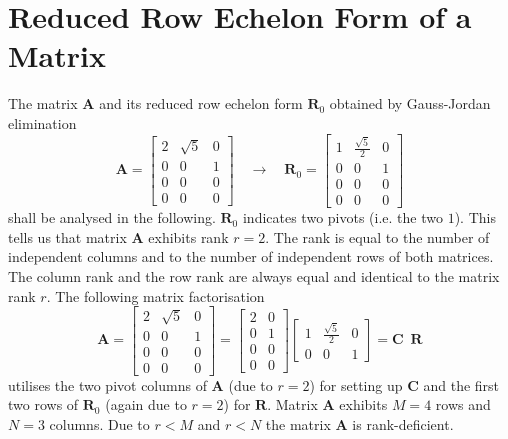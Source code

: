 \documentclass[a4paper, 11pt]{scrartcl}
\begin{document}
\pagestyle{fancy}
\fancyhf{} %
\fancyfoot[C]{\thepage}

\section{Reduced Row Echelon Form of a Matrix}
\label{sec:rref}
The matrix $\bm{A}$ and its reduced row echelon form $\bm{R}_0$ obtained by Gauss-Jordan elimination
$$
\bm{A} =
\begin{bmatrix}
2 & \sqrt{5} & 0\\
0 & 0 & 1\\
0 & 0 & 0\\
0 & 0 & 0
\end{bmatrix}
\quad\rightarrow\quad
\bm{R}_0 =
\begin{bmatrix}
1 & \frac{\sqrt{5}}{2} & 0\\
0 & 0 & 1\\
0 & 0 & 0\\
0 & 0 & 0
\end{bmatrix}
$$
shall be analysed in the following. $\bm{R}_0$ indicates two pivots (i.e. the two $1$).
This tells us that matrix $\bm{A}$ exhibits rank $r=2$.
The rank is equal to the number of independent columns and to the number of independent rows of both matrices.
The column rank and the row rank are always equal and identical to the matrix rank $r$.
%
The following matrix factorisation
$$
\bm{A} =
\begin{bmatrix}
2 & \sqrt{5} & 0\\
0 & 0 & 1\\
0 & 0 & 0\\
0 & 0 & 0
\end{bmatrix}
=
\begin{bmatrix}
2 &  0\\
0 & 1\\
0 & 0\\
0 & 0
\end{bmatrix}
\begin{bmatrix}
1 & \frac{\sqrt{5}}{2} & 0\\
0 & 0 & 1
\end{bmatrix}
=
\bm{C} \,\,\, \bm{R}
$$
utilises the two pivot columns of $\bm{A}$ (due to $r=2$) for setting up $\bm{C}$ and the first two rows of $\bm{R}_0$ (again due to $r=2$) for $\bm{R}$.
%
Matrix $\bm{A}$ exhibits $M=4$ rows and $N=3$ columns.
%
Due to $r<M$ and $r<N$ the matrix $\bm{A}$ is rank-deficient.
\end{document}
